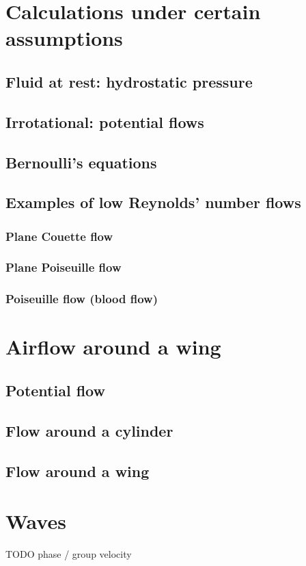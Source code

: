 \chapter{Calculations under certain assumptions}
\section{Fluid at rest: hydrostatic pressure}
\section{Irrotational: potential flows}
\section{Bernoulli's equations}
\section{Examples of low Reynolds' number flows}
\subsection{Plane Couette flow}
\subsection{Plane Poiseuille flow}
\subsection{Poiseuille flow (blood flow)}

\chapter{Airflow around a wing}
\section{Potential flow}
\section{Flow around a cylinder}
\section{Flow around a wing}

\chapter{Waves}
TODO phase / group velocity
